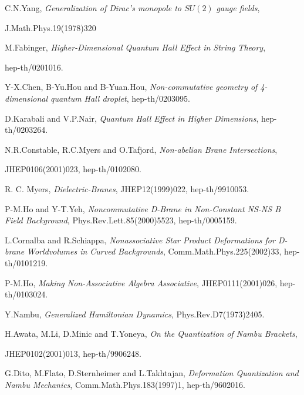 \documentclass[a4paper,11pt]{article}
\begin{document}
\begin{thebibliography}{99}
C.N.Yang, 
{\it Generalization of Dirac's monopole to $SU(2)$ 
gauge fields}, 

J.Math.Phys.19(1978)320

M.Fabinger, 
{\it Higher-Dimensional Quantum Hall Effect in String Theory}, 

hep-th/0201016. 

Y-X.Chen, B-Yu.Hou and B-Yuan.Hou, 
{\it Non-commutative geometry of 4-dimensional quantum Hall droplet}, 
hep-th/0203095.  

D.Karabali and V.P.Nair, 
{\it Quantum Hall Effect in Higher Dimensions}, 
hep-th/0203264.  

N.R.Constable, R.C.Myers and O.Tafjord, 
{\it Non-abelian Brane Intersections}, 

JHEP0106(2001)023, 
hep-th/0102080. 

R. C. Myers, 
{\it Dielectric-Branes}, 
JHEP12(1999)022, hep-th/9910053. 

P-M.Ho and Y-T.Yeh, 
{\it Noncommutative D-Brane in Non-Constant NS-NS B Field Background}, 
Phys.Rev.Lett.85(2000)5523, 
hep-th/0005159. 


L.Cornalba and R.Schiappa, 
{\it Nonassociative Star Product Deformations for D-brane 
Worldvolumes in Curved Backgrounds}, 
Comm.Math.Phys.225(2002)33, hep-th/0101219. 

P-M.Ho, 
{\it Making Non-Associative Algebra Associative}, 
JHEP0111(2001)026, hep-th/0103024.  

Y.Nambu, 
{\it Generalized Hamiltonian Dynamics}, 
Phys.Rev.D7(1973)2405.

H.Awata, M.Li, D.Minic and T.Yoneya, 
{\it On the Quantization of Nambu Brackets}, 

JHEP0102(2001)013, hep-th/9906248. 

G.Dito, M.Flato, D.Sternheimer and L.Takhtajan, 
{\it Deformation Quantization and Nambu Mechanics}, 
Comm.Math.Phys.183(1997)1, hep-th/9602016.  



%

\end{thebibliography}
\end{document}
